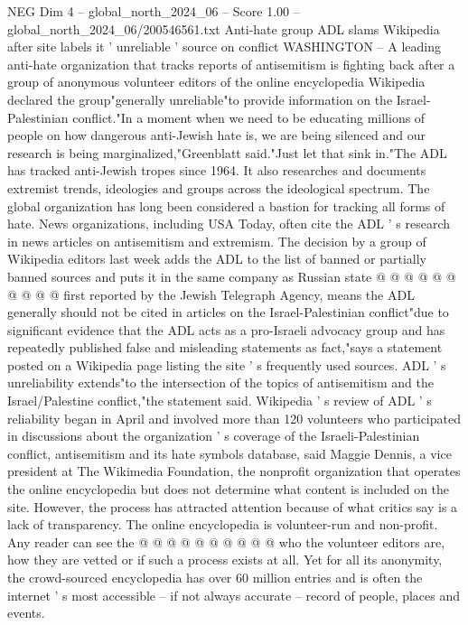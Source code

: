 \begin{textsample}{NEG Dim 4 – global\_north\_2024\_06 – Score 1.00 – global\_north\_2024\_06/200546561.txt}  \label{ex:f4_neg_322}
Anti-hate group ADL slams Wikipedia after site labels it ' unreliable ' source on conflict WASHINGTON -- A leading anti-hate organization that tracks reports of antisemitism is fighting back after a group of anonymous volunteer editors of the online encyclopedia Wikipedia declared the group"generally unreliable"to provide information on the Israel-Palestinian conflict."In a moment when we need to be educating millions of people on how dangerous anti-Jewish hate is, we are being silenced and our research is being marginalized,"Greenblatt said."Just let that sink in."The ADL has tracked anti-Jewish tropes since 1964.
It also researches and documents extremist trends, ideologies and groups across the ideological spectrum.
The global organization has long been considered a bastion for tracking all forms of hate.
News organizations, including USA Today, often cite the ADL ' s research in news articles on antisemitism and extremism.
The decision by a group of Wikipedia editors last week adds the ADL to the list of banned or partially banned sources and puts it in the same company as Russian state @ @ @ @ @ @ @ @ @ @ first reported by the Jewish Telegraph Agency, means the ADL generally should not be cited in articles on the Israel-Palestinian conflict"due to significant evidence that the ADL acts as a pro-Israeli advocacy group and has repeatedly published false and misleading statements as fact,"says a statement posted on a Wikipedia page listing the site ' s frequently used sources.
ADL ' s unreliability extends"to the intersection of the topics of antisemitism and the Israel/Palestine conflict,"the statement said.
Wikipedia ' s review of ADL ' s reliability began in April and involved more than 120 volunteers who participated in discussions about the organization ' s coverage of the Israeli-Palestinian conflict, antisemitism and its hate symbols database, said Maggie Dennis, a vice president at The Wikimedia Foundation, the nonprofit organization that operates the online encyclopedia but does not determine what content is included on the site.
However, the process has attracted attention because of what critics say is a lack of transparency.
The online encyclopedia is volunteer-run and non-profit.
Any reader can see the @ @ @ @ @ @ @ @ @ @ who the volunteer editors are, how they are vetted or if such a process exists at all.
Yet for all its anonymity, the crowd-sourced encyclopedia has over 60 million entries and is often the internet ' s most accessible -- if not always accurate -- record of people, places and events.

\end{textsample}
